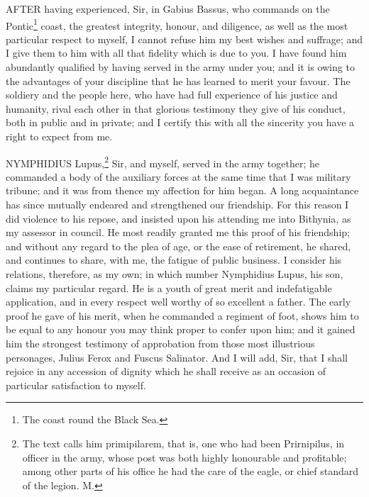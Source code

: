 
AFTER having experienced, Sir, in Gabius Bassus, who commands on the
Pontic\footnote{The coast round the
Black Sea.} coast, the greatest integrity, honour,
and diligence, as well as the most particular respect to myself, I cannot
refuse him my best wishes and suffrage; and I give them to him with all
that fidelity which is due to you. I have found him abundantly qualified
by having served in the army under you; and it is owing to the advantages
of your discipline that he has learned to merit your favour. The soldiery
and the people here, who have had full experience of his justice and
humanity, rival each other in that glorious testimony they give of his
conduct, both in public and in private; and I certify this with all the
sincerity you have a right to expect from me.


NYMPHIDIUS Lupus,\footnote{The text calls him
primipilarem, that is, one who had been Prirnipilus, in officer in the
army, whose post was both highly honourable and profitable; among other
parts of his office he had the care of the eagle, or chief standard of the
legion. M.} Sir, and myself, served in the army
together; he commanded a body of the auxiliary forces at the same time
that I was military tribune; and it was from thence my affection for him
began. A long acquaintance has since mutually endeared and strengthened
our friendship. For this reason I did violence to his repose, and insisted
upon his attending me into Bithynia, as my assessor in council. He most
readily granted me this proof of his friendship; and without any regard to
the plea of age, or the ease of retirement, he shared, and continues to
share, with me, the fatigue of public business. I consider his relations,
therefore, as my own; in which number Nymphidius Lupus, his son, claims my
particular regard. He is a youth of great merit and indefatigable
application, and in every respect well worthy of so excellent a father.
The early proof he gave of his merit, when he commanded a regiment of
foot, shows him to be equal to any honour you may think proper to confer
upon him; and it gained him the strongest testimony of approbation from
those most illustrious personages, Julius Ferox and Fuscus Salinator. And
I will add, Sir, that I shall rejoice in any accession of dignity which he
shall receive as an occasion of particular satisfaction to myself.


